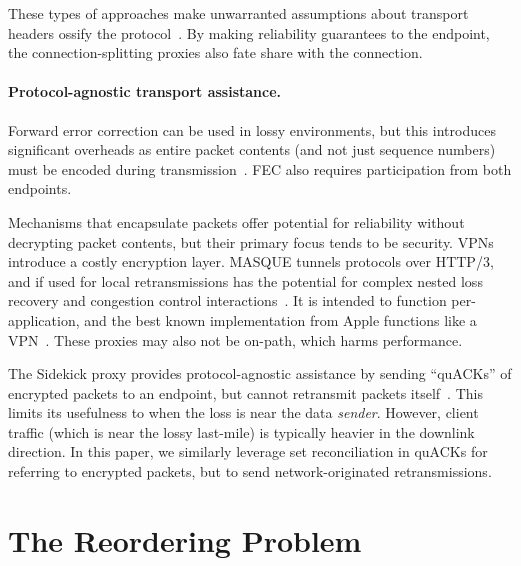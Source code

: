 These types of approaches make unwarranted assumptions about
transport headers ossify the protocol~\cite{papastergiou2017deossifying}.
By making reliability guarantees to the endpoint, the connection-splitting
proxies also fate share with the connection.

\paragraph{Protocol-agnostic transport assistance.}

Forward error correction can be used in lossy environments, but this
introduces significant overheads as entire packet contents (and not just
sequence numbers) must be encoded during transmission~\cite
{rfc9265}. FEC also requires participation from both endpoints.

Mechanisms that encapsulate packets offer potential for reliability without
decrypting packet contents, but their primary focus tends to be security. VPNs
introduce a costly encryption layer. MASQUE tunnels protocols over HTTP/3, and
if used for local retransmissions has the potential for complex nested loss
recovery and congestion control interactions~\cite
{rfc9298,schinazi-masque-proxy-05,kramer2021masquepep}. It is intended to
function per-application, and the best known implementation from Apple
functions like a VPN~\cite{icloud-private-relay}. These proxies may also not be
on-path, which harms performance.

The Sidekick proxy provides protocol-agnostic assistance by sending
``quACKs'' of encrypted packets to an endpoint, but cannot retransmit
packets itself~\cite{yuan2024sidekick}. This limits its usefulness
to when the loss is near the data \textit{sender}.
However, client traffic (which is near the lossy last-mile) is typically heavier
in the downlink direction. In this paper, we similarly leverage set
reconciliation in quACKs for referring to encrypted packets,
but to send network-originated retransmissions.

\section{The Reordering Problem}

